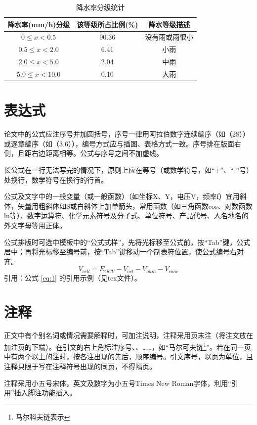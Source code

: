 \documentclass{seuthesis-2022}
\begin{document}
\begin{table}[H]
  \centering
  \caption{降水率分级统计}
  \label{tab:1}
  \small
  \begin{tabular}{ccc}
    \toprule
    降水率(mm/h)分级 & 该等级所占比例(\%) & 降水等级描述\\
    \midrule
    $0\le x< 0.5$ & 90.36 & 没有雨或雨很小\\
    $0.5\le x< 2.0$ & 6.41 & 小雨\\
    $2.0\le x< 5.0$ & 2.04 & 中雨\\
    $5.0\le x< 10.0$ & 0.10 & 大雨\\
    \bottomrule
  \end{tabular}
\end{table}

\section{表达式}
论文中的公式应注序号并加圆括号，序号一律用阿拉伯数字连续编序（如（28））或逐章编序（如（3.6）），编号方式应与插图、表格方式一致。序号排在版面右侧，且距右边距离相等。公式与序号之间不加虚线。

长公式在一行无法写完的情况下，原则上应在等号（或数学符号，如“+”、“-”号）处换行，数学符号在换行的行首。

公式及文字中的一般变量（或一般函数）（如坐标X、Y，电压V，频率f）宜用斜体，矢量用粗斜体如S或白斜体上加单箭头，常用函数（如三角函数cos、对数函数ln等）、数字运算符、化学元素符号及分子式、单位符号、产品代号、人名地名的外文字母等用正体。

公式排版时可选中模板中的“公式式样”，先将光标移至公式前，按“Tab”键，公式居中；再将光标移至编号前，按“Tab”键移动一个制表符位置，使公式编号右对齐。
\begin{equation}\label{eq:1}
  V_{cell}=E_{OCV}-V_{oct}-V_{ohm}-V_{conc}
  \end{equation}
引用：公式 \eqref{eq:1} 的引用示例（见tex文件）。

  
\section{注释}
正文中有个别名词或情况需要解释时，可加注说明，注释采用页末注（将注文放在加注页的下端）。在引文的右上角标注序号、、……，如“马尔可夫链\footnote{马尔科夫链表示}”。若在同一页中有两个以上的注时，按各注出现的先后，顺序编号。引文序号，以页为单位，且注释只限于写在注释符号出现的同页，不得隔页。

注释采用小五号宋体，英文及数字为小五号Times New Roman字体，利用“引用”插入脚注功能插入。
\end{document}
